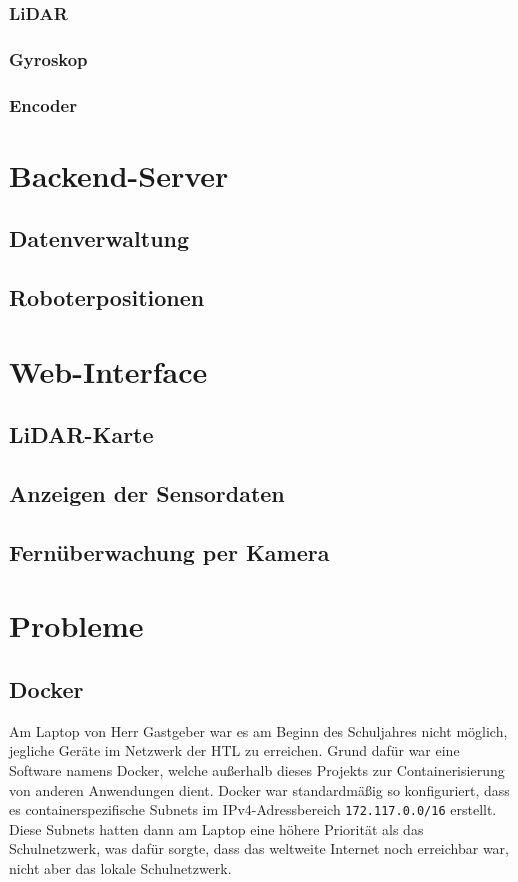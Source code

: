 \documentclass[12pt]{article}
\begin{document}
	\subsubsection{LiDAR}
	\label{lidar}
	\subsubsection{Gyroskop}
	\subsubsection{Encoder}
	\section{Backend-Server}
	\subsection{Datenverwaltung}
	\subsection{Roboterpositionen}
	\section{Web-Interface}
	\subsection{LiDAR-Karte}
	\subsection{Anzeigen der Sensordaten}
	\subsection{Fernüberwachung per Kamera}
	\section{Probleme}
	\subsection{Docker}
	Am Laptop von Herr Gastgeber war es am Beginn des Schuljahres nicht möglich,
	jegliche Geräte im Netzwerk der HTL zu erreichen.
	Grund dafür war eine Software namens Docker,
	welche außerhalb dieses Projekts zur Containerisierung von anderen Anwendungen dient.
	Docker war standardmäßig so konfiguriert,
	dass es containerspezifische Subnets im IPv4-Adressbereich \allowbreak\texttt{172.117.0.0/16} erstellt.
	Diese Subnets hatten dann am Laptop eine höhere Priorität als das Schulnetzwerk,
	was dafür sorgte,
	dass das weltweite Internet noch erreichbar war, 
	nicht aber das lokale Schulnetzwerk.

	\newpage
	\begin{appendix}
		\listoffigures
		\listoftables
	\end{appendix}
	\vspace{1cm}
\end{document}
